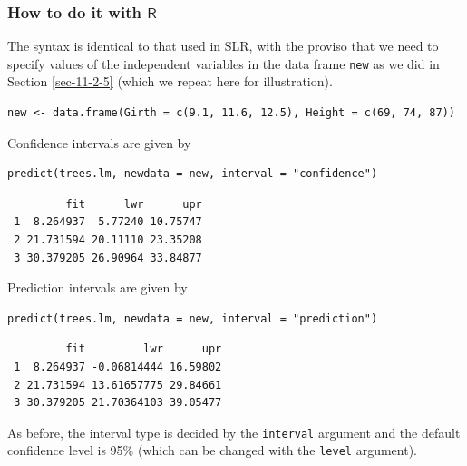 \documentclass[captions=tableheading]{scrbook}
\begin{document}
\subsubsection{How to do it with \(\mathsf{R}\)}
\label{sec-12-2-5-1}


The syntax is identical to that used in SLR, with the proviso that we need to specify values of the independent variables in the data frame \texttt{new} as we did in Section \ref{sec-11-2-5} (which we repeat here for illustration).


\begin{verbatim}
new <- data.frame(Girth = c(9.1, 11.6, 12.5), Height = c(69, 74, 87))
\end{verbatim}

Confidence intervals are given by


\begin{verbatim}
predict(trees.lm, newdata = new, interval = "confidence")
\end{verbatim}

\begin{verbatim}
         fit      lwr      upr
 1  8.264937  5.77240 10.75747
 2 21.731594 20.11110 23.35208
 3 30.379205 26.90964 33.84877
\end{verbatim}



Prediction intervals are given by


\begin{verbatim}
predict(trees.lm, newdata = new, interval = "prediction")
\end{verbatim}

\begin{verbatim}
         fit         lwr      upr
 1  8.264937 -0.06814444 16.59802
 2 21.731594 13.61657775 29.84661
 3 30.379205 21.70364103 39.05477
\end{verbatim}



As before, the interval type is decided by the \texttt{interval} argument and the default confidence level is 95\% (which can be changed with the \texttt{level} argument).
\end{document}
